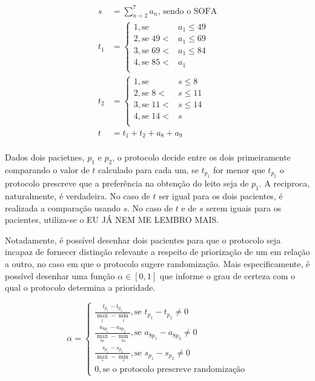 \documentclass[12pt]{article}
\begin{document}
\[
\begin{split}
    s &= \sum_{n=2}^{7} a_n\text{, sendo o SOFA} \\
    t_1 &=  \begin{cases}
        1, \text{se } & a_1 \le 49 \\
        2, \text{se } 49 < & a_1 \le 69 \\
        3, \text{se } 69 < & a_1 \le 84 \\
        4, \text{se } 85 < & a_1 \\
    \end{cases} \\
    t_2 &= \begin{cases}
        1, \text{se } & s \le 8 \\
        2, \text{se } 8 < & s \le 11 \\
        3, \text{se } 11 < & s \le  14 \\
        4, \text{se } 14 < & s \\
    \end{cases} \\
    t &= t_1 + t_2 + a_8 + a_9 \\ %
\end{split}
\] 

Dados dois pacietnes, $p_1$ e $p_2$, o protocolo decide entre os dois primeiramente comparando o valor de $t$ calculado para cada um, se  $t_{p_1}$ for menor que $t_{p_2}$ o protocolo prescreve que a preferência na obtenção do leito seja de  $p_1.$
A reciproca, naturalmente, é verdadeira.
No caso de $t$ ser igual para os dois pacientes, é realizada a comparação usando  $s$. 
No caso de $t$ e de  $s$ serem iguais para os pacientes, utiliza-se o EU JÁ NEM ME LEMBRO MAIS.

Notadamente, é possível desenhar dois pacientes para que o protocolo seja incapaz de fornecer distinção relevante a respeito de priorização de um em relação a outro, no caso em que o protocolo sugere randomização.
Mais especificamente, é possível desenhar uma função $\alpha \in [0, 1]$ que informe o grau de certeza com o qual o protocolo determina a prioridade.

\[
\alpha = \begin{cases}
    \frac{t_{p_1} - t_{p_2}}{\max_t - \min_t}, \text{se } t_{p_1} - t_{p_2} \neq 0 \\
    \frac{a_{8p_1} - a_{8p_2}}{\max_{a_8} - \min_{a_8}}, \text{se } a_{8p_1} - a_{8p_2} \neq 0 \\
    \frac{s_{p_1} - s_{p_2}}{\max_s - \min_s}, \text{se } s_{p_1} - s_{p_2} \neq 0 \\
    0, \text{se o protocolo prescreve randomização}
\end{cases}
\] 
\end{document}
